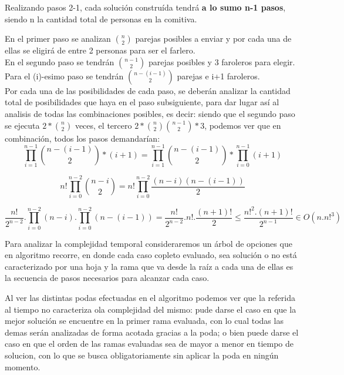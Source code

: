 \vspace*{1em}

Realizando pasos 2-1, cada solución construída tendrá {\bf a lo sumo n-1 pasos}, siendo n la cantidad total de personas en la comitiva.

En el primer paso se analizan $\binom {n}{2}$ parejas posibles a enviar y por cada una de ellas se eligirá de entre 2 personas para ser el farlero.\\

En el segundo paso se tendr\'an $\binom {n-1}{2}$ parejas posibles y 3 faroleros para elegir.\\

Para el (i)-esimo paso se tendrán $\binom {n-(i-1)}{2}$ parejas e i+1 faroleros.\\

Por cada una de las posibilidades de cada paso, se deber\'an analizar la cantidad total de
posibilidades que haya en el paso subsiguiente, para dar lugar as\'i al analisis de todas las combinaciones posibles, es decir: siendo que el segundo paso se ejecuta $2 \ast \binom {n}{2}$ veces, el tercero $2 \ast \binom {n}{2} \binom{n-1} {2} \ast 3$, podemos ver que en combinación, todos los pasos demandarían:
\[
\prod_{i=1}^{n-1}\binom {n-(i-1)}{2}*(i+1) = \prod_{i=1}^{n-1}\binom {n-(i-1)}{2} * \prod_{i=0}^{n-1}(i+1)
\]

\[
n!\prod_{i=0}^{n-2}\binom {n-i}{2} = n!\prod_{i=0}^{n-2}\frac{(n-i)(n-(i-1))}{2}
\]

\[
\frac{ n!}{2^{n-2}}.\prod_{i=0}^{n-2}(n-i).\prod_{i=0}^{n-2}(n-(i-1)) = \frac{n!}{2^{n-2}}.n!.\frac{(n+1)!}{2}\leq \frac{n!^{2}.(n+1)!}{2^{n-1}}\in O(n.n!^{3})
\]

Para analizar la complejidad temporal consideraremos un árbol de opciones que en algoritmo recorre, en donde cada caso copleto evaluado, sea solución o no está caracterizado por una hoja y la rama que va desde la raíz a cada una de ellas es la secuencia de pasos necesarios para alcanzar cada caso.

Al ver las distintas podas efectuadas en el algoritmo podemos ver que la referida al tiempo no caracteriza ola complejidad del mismo: pude darse el caso en que la mejor solución se encuentre en la primer rama evaluada, con lo cual todas las demas serán analizadas de forma acotada gracias a la poda; o bien puede darse el caso en que el orden de las ramas evaluadas sea de mayor a menor en tiempo de solucion, con lo que se busca obligatoriamente sin aplicar la poda en ningún momento.

